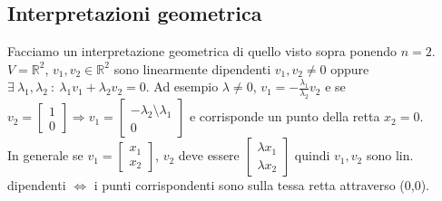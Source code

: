 \subsection{Interpretazioni geometrica}
Facciamo un interpretazione geometrica di quello visto sopra ponendo $n=2$. $V = \mathbb{R}^2$, $v_1, v_2 \in \mathbb{R}^2$ sono linearmente dipendenti $v_1, v_2 \neq 0$ oppure $\exists \: \lambda_1, \lambda_2 \: : \: \lambda_1 v_1 + \lambda_2 v_2 = 0$. Ad esempio $\lambda \neq 0$, $v_1 = -\frac{\lambda_1}{\lambda_2}v_2$ e se $v_2 = \begin{bmatrix}1\\0\end{bmatrix} \Longrightarrow v_1 = \begin{bmatrix}-\lambda_2\setminus\lambda_1\\0\end{bmatrix}$ e corrisponde un punto della retta $x_2 = 0$. \\
In generale se $v_1 = \begin{bmatrix}x_1\\x_2\end{bmatrix}$, $v_2$ deve essere $\begin{bmatrix}\lambda x_1 \\ \lambda x_2\end{bmatrix}$ quindi $v_1, v_2$ sono lin. dipendenti $\Longleftrightarrow$ i punti corrispondenti sono sulla tessa retta attraverso (0,0).
